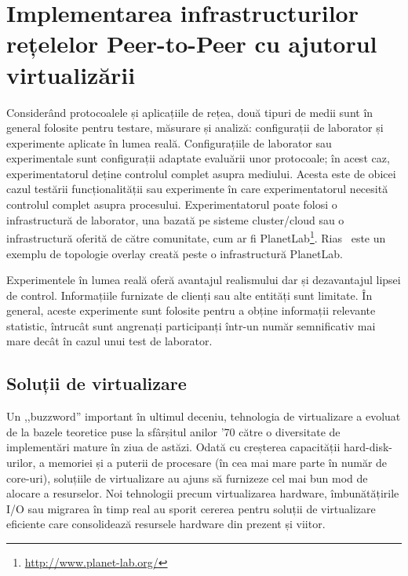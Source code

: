 
\chapter{Implementarea infrastructurilor rețelelor Peer-to-Peer cu ajutorul
virtualizării}
\label{chapter:virt-infra}

Considerând protocoalele și aplicațiile de rețea, două tipuri de medii
sunt în general folosite pentru testare, măsurare și analiză: configurații
de laborator și experimente aplicate în lumea reală. Configurațiile
de laborator sau experimentale sunt configurații adaptate evaluării
unor protocoale; în acest caz, experimentatorul deține controlul
complet asupra mediului. Acesta este de obicei cazul testării
funcționalității sau experimente în care experimentatorul necesită controlul
complet asupra procesului. Experimentatorul poate folosi o infrastructură
de laborator, una bazată pe sisteme cluster/cloud sau o infrastructură
oferită de către comunitate, cum ar fi
PlanetLab\footnote{\url{http://www.planet-lab.org/}}. Rias~\cite{rias} este
un exemplu de topologie overlay creată peste o infrastructură PlanetLab.

Experimentele în lumea reală oferă avantajul realismului dar și dezavantajul
lipsei de control. Informațiile furnizate de clienți sau alte entități sunt
limitate. În general, aceste experimente sunt folosite pentru a obține
informații relevante statistic, întrucât sunt angrenați participanți într-un
număr semnificativ mai mare decât în cazul unui test de laborator.

\section{Soluții de virtualizare}
\label{sec:virt-infra:openvz}

Un ,,buzzword'' important în ultimul deceniu, tehnologia de virtualizare
a evoluat de la bazele teoretice puse la sfârșitul anilor '70 către o
diversitate de implementări mature în ziua de astăzi. Odată cu creșterea
capacității hard-disk-urilor, a memoriei și a puterii de procesare
(în cea mai mare parte în număr de core-uri), soluțiile de virtualizare
au ajuns să furnizeze cel mai bun mod de alocare a resurselor. Noi
tehnologii precum virtualizarea hardware, îmbunătățirile I/O sau migrarea
în timp real au sporit cererea pentru soluții de virtualizare eficiente
care consolidează resursele hardware din prezent și viitor.

